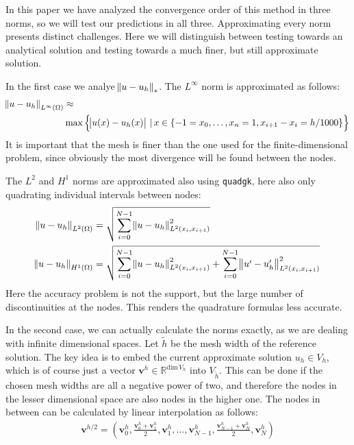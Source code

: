 \documentclass[headsepline,footsepline,footinclude=false,oneside,fontsize=11pt,paper=a4,listof=totoc,bibliography=totoc]{scrbook} %
\begin{document}
In this paper we have analyzed the convergence order of this method in three norms, so we will test our predictions in all three. Approximating every norm presents distinct challenges. Here we will distinguish between testing towards an analytical solution and testing towards a much finer, but still approximate solution.

In the first case we analye $\norm{u-u_h}_*$. The $L^\infty$ norm is approximated as follows:
\begin{align}
\norm{u-u_h}_{L^\infty(\Omega)} &\approx \\ &\max \left\{\abs{u(x) - u_h(x)} \,|\, x \in \{-1 = x_0,\dots, x_n = 1, x_{i+1} - x_i = h/1000\} \right\} \nonumber 
\end{align}
It is important that the mesh is finer than the one used for the finite-dimensional problem, since obviously the most divergence will be found between the nodes.

The $L^2$ and $H^1$ norms are approximated also using \verb|quadgk|, here also only quadrating individual intervals between nodes:
\begin{align}
\begin{split}
	\norm{u-u_h}_{L^2(\Omega)} &= \sqrt{\sum_{i=0}^{N-1} \norm{u-u_h}_{L^2(x_i, x_{i+1})}^2 } \\
	\norm{u-u_h}_{H^1(\Omega)} &= \sqrt{\sum_{i=0}^{N-1} \norm{u-u_h}_{L^2(x_i, x_{i+1})}^2 + \sum_{i=0}^{N-1} \norm{u'-u_h'}_{L^2(x_i, x_{i+1})}^2} 
\end{split}
\end{align}
 Here the accuracy problem is not the support, but the large number of discontinuities at the nodes. This renders the quadrature formulas less accurate.

In the second case, we can actually calculate the norms exactly, as we are dealing with infinite dimensional spaces. Let $\tilde{h}$ be the mesh width of the reference solution. The key idea is to embed the current approximate solution $u_h \in V_h$, which is of course just a vector $\mathbf{v}^h \in \mathbb{R}^{\mathrm{dim}\, V_h}$ into $V_{\tilde{h}}$. This can be done if the chosen mesh widths are all a negative power of two, and therefore the nodes in the lesser dimensional space are also nodes in the higher one. The nodes in between can be calculated by linear interpolation as follows:
\begin{align*}
	\mathbf{v}^{h/2} = \left(\mathbf{v}^h_0, \frac{\mathbf{v}^h_0 + \mathbf{v}^h_1}{2} , \mathbf{v}^h_1, \dots, \mathbf{v}^h_{N-1}, \frac{\mathbf{v}^h_{N-1} + \mathbf{v}^h_N}{2}, \mathbf{v}^h_N \right)
\end{align*}
\end{document}
